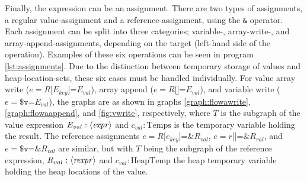 Finally, the expression can be an assignment. There are two types of assignments, a regular value-assignment and a reference-assignment, using the \texttt{\&} operator. Each assignment can be split into three categories; variable-, array-write-, and array-append-assignments, depending on the target (left-hand side of the operation). Examples of these six operations can be seen in program \ref{lst:assignments}. Due to the distinction between temporary storage of values and heap-location-sets, these six cases must be handled individually. For value array write ($e = R\texttt{[$E_{key}$]=} E_{val}$), array append ($e = R\texttt{[]=} E_{val}$), and variable write ($e = \texttt{\$v=} E_{val}$), the graphs are as shown in graphs \ref{graph:flowawrite}, \ref{graph:flowaappend}, and \ref{fig:vwrite}, respectively, where $T$ is the subgraph of the value expression $E_{val} : \langle\mathit{expr}\rangle$ and $c_{val} : \text{Temps}$ is the temporary variable holding the result. The reference assignments $e = R\texttt{[$e_{key}$]=\&} R_{val}$, $e = r\texttt{[]=\&} R_{val}$, and $e = \texttt{\$v=\&} R_{val}$ are similar, but with $T$ being the subgraph of the reference expression, $R_{val} : \langle\mathit{rexpr}\rangle$ and $c_{val} : \text{HeapTemp}$ the heap temporary variable holding the heap locations of the value.
